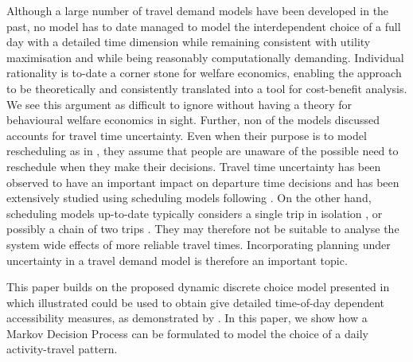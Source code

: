 

Although a large number of travel demand models  have been developed in the past, no model has to date managed to model the interdependent choice of a full day with a detailed time dimension while remaining consistent with utility maximisation and while being reasonably computationally demanding. Individual rationality is to-date a corner stone for welfare economics, enabling the approach to be theoretically and consistently translated into a tool for cost-benefit analysis. We see this argument as difficult to ignore without having a theory for behavioural welfare economics in sight. Further, non of the models discussed accounts for travel time uncertainty. Even when their purpose is to model rescheduling as in \citet{joh2003Aurora}, they assume that people are unaware of the possible need to reschedule when they make their decisions. Travel time uncertainty has been observed to have an important impact on departure time decisions and has been extensively studied using scheduling models following \citet{small82scheduling}. On the other hand, scheduling models up-to-date typically considers a single trip in isolation \citep[as in, e.g.,][]{fosgerau10reliability}, or possibly a chain of two trips \citep{jenelius11tripchain}. They may therefore not be suitable to analyse the system wide effects of more reliable travel times. Incorporating planning under uncertainty in a travel demand model is therefore an important topic. 

This paper builds on the proposed dynamic discrete choice model presented in \citet{karlstrom04} which \citet{jonsson2014reconciling} illustrated could be used to obtain give detailed time-of-day dependent accessibility measures, as demonstrated by \citet{jonsson2014reconciling}. In this paper, we show how a Markov Decision Process can be formulated to model the choice of a daily activity-travel pattern. 

